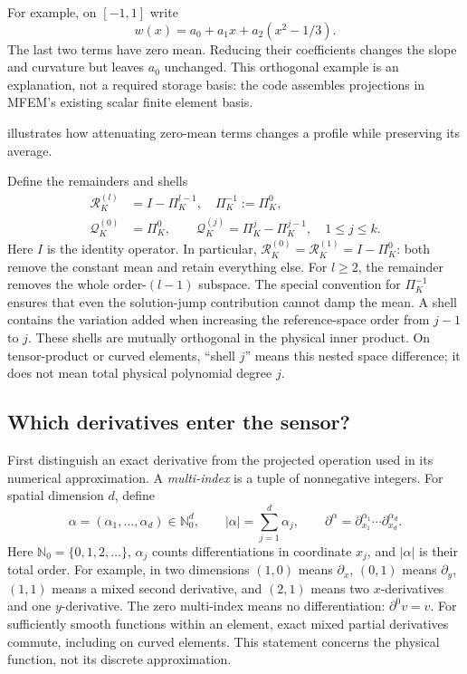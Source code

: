 For example, on $[-1,1]$ write
\begin{equation}
 w(x)=a_0+a_1x+a_2(x^2-1/3).
\end{equation}
The last two terms have zero mean. Reducing their coefficients changes the
slope and curvature but leaves $a_0$ unchanged. This orthogonal example is an
explanation, not a required storage basis: the code assembles projections in
MFEM's existing scalar finite element basis.

 illustrates how attenuating zero-mean terms
changes a profile while preserving its average.


Define the remainders and shells
\begin{align}
 \mathcal R_K^{(l)}&=I-\Pi_K^{l-1},\quad \Pi_K^{-1}:=\Pi_K^0,
 \label{eq:ofdg-high-pass}\\
 \mathcal Q_K^{(0)}&=\Pi_K^0,\qquad
 \mathcal Q_K^{(j)}=\Pi_K^j-\Pi_K^{j-1},\quad 1\leq j\leq k.
 \label{eq:ofdg-modal-shells}
\end{align}
Here $I$ is the identity operator. In particular,
$\mathcal R_K^{(0)}=\mathcal R_K^{(1)}=I-\Pi_K^0$: both remove the
constant mean and retain everything else. For $l\geq2$, the remainder
removes the whole order-$(l-1)$ subspace. The special convention for
$\Pi_K^{-1}$ ensures that even the solution-jump contribution cannot damp
the mean. A shell contains the variation added when increasing the reference-space order
from $j-1$ to $j$. These shells are mutually orthogonal in the physical inner
product. On tensor-product or curved elements, ``shell $j$'' means this nested
space difference; it does not mean total physical polynomial degree $j$.

\subsection{Which derivatives enter the sensor?}
\label{sec:projected-derivatives}
First distinguish an exact derivative from the projected operation used in
its numerical approximation. A \emph{multi-index} is a tuple of nonnegative
integers. For spatial dimension $d$, define
\begin{equation}
 \alpha=(\alpha_1,\ldots,\alpha_d)\in\mathbb N_0^d,\qquad
 |\alpha|=\sum_{j=1}^d\alpha_j,\qquad
 \partial^\alpha=\partial_{x_1}^{\alpha_1}\cdots
                         \partial_{x_d}^{\alpha_d}.
 \label{eq:derivative-multi-index}
\end{equation}
Here $\mathbb N_0=\{0,1,2,\ldots\}$, $\alpha_j$ counts differentiations in
coordinate $x_j$, and $|\alpha|$ is their total order. For example, in two
dimensions $(1,0)$ means $\partial_x$, $(0,1)$ means $\partial_y$,
$(1,1)$ means a mixed second derivative, and $(2,1)$ means two
$x$-derivatives and one $y$-derivative. The zero multi-index means no
differentiation: $\partial^0v=v$. For sufficiently smooth functions within
an element, exact mixed partial derivatives commute, including on curved
elements. This statement concerns the physical function, not its discrete
approximation.

